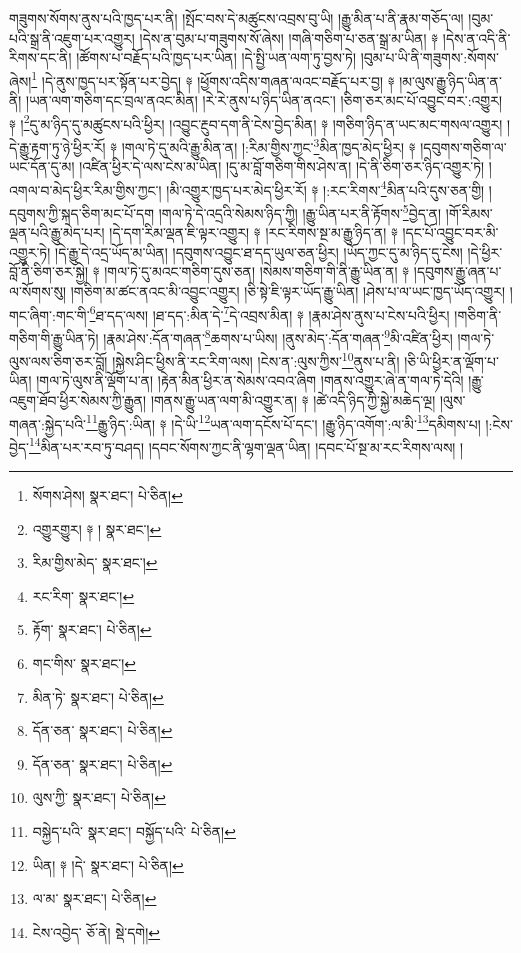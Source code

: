 གཟུགས་སོགས་ནུས་པའི་ཁྱད་པར་ནི། །སྤོང་བས་དེ་མཚུངས་འབྲས་བུ་ཡི། །རྒྱུ་མིན་པ་ནི་རྣམ་གཅོད་ལ། །བུམ་པའི་སྒྲ་ནི་འཇུག་པར་འགྱུར། །དེས་ན་བུམ་པ་གཟུགས་སོ་ཞེས། །གཞི་གཅིག་པ་ཅན་སྒྲ་མ་ཡིན། ༈ །དེས་ན་འདི་ནི་རིགས་དང་ནི། །ཚོགས་པ་བརྗོད་པའི་ཁྱད་པར་ཡིན། །དེ་སྤྱི་ཡན་ལག་ཏུ་བྱས་ཏེ། །བུམ་པ་ཡི་ནི་གཟུགས་:སོགས་ཞེས།\footnote{སོགས་ཤེས།  སྣར་ཐང་།  པེ་ཅིན། } །དེ་ནུས་ཁྱད་པར་སྟོན་པར་བྱེད། ༈ །ཕྱོགས་འདིས་གཞན་ལའང་བརྗོད་པར་བྱ། ༈ །མ་ལུས་རྒྱུ་ཉིད་ཡིན་ན་ནི། །ཡན་ལག་གཅིག་དང་བྲལ་ནའང་མིན། །རེ་རེ་ནུས་པ་ཉིད་ཡིན་ནའང་། །ཅིག་ཅར་མང་པོ་འབྱུང་བར་:འགྱུར། ༈ །\footnote{འགྱུརགྱུར། ༈ །  སྣར་ཐང་། }དུ་མ་ཉིད་དུ་མཚུངས་པའི་ཕྱིར། །འབྱུང་རྔུབ་དག་ནི་ངེས་བྱེད་མིན། ༈ །གཅིག་ཉིད་ན་ཡང་མང་གསལ་འགྱུར། །དེ་རྒྱུ་རྟག་ཏུ་ཉེ་ཕྱིར་རོ། ༈ །གལ་ཏེ་དུ་མའི་རྒྱུ་མིན་ན། །:རིམ་གྱིས་ཀྱང་\footnote{རིམ་གྱིས་མེད་  སྣར་ཐང་། }མིན་ཁྱད་མེད་ཕྱིར། ༈ །དབུགས་གཅིག་ལ་ཡང་དོན་དུ་མ། །འཛིན་ཕྱིར་དེ་ལས་ངེས་མ་ཡིན། །དུ་མ་བློ་གཅིག་གིས་ཤེས་ན། །དེ་ནི་ཅིག་ཅར་ཉིད་འགྱུར་ཏེ། །འགལ་བ་མེད་ཕྱིར་རིམ་གྱིས་ཀྱང་། །མི་འགྱུར་ཁྱད་པར་མེད་ཕྱིར་རོ། ༈ །:རང་རིགས་\footnote{རང་རིག་  སྣར་ཐང་། }མིན་པའི་དུས་ཅན་གྱི། །དབུགས་ཀྱི་སྐད་ཅིག་མང་པོ་དག །གལ་ཏེ་དེ་འདྲའི་སེམས་ཉིད་ཀྱི། །རྒྱུ་ཡིན་པར་ནི་རྟོགས་\footnote{རྟོག་  སྣར་ཐང་།  པེ་ཅིན། }བྱེད་ན། །གོ་རིམས་ལྡན་པའི་རྒྱུ་མེད་པར། །དེ་དག་རིམ་ལྡན་ཇི་ལྟར་འགྱུར། ༈ །རང་རིགས་སྔ་མ་རྒྱུ་ཉིད་ན། ༈ །དང་པོ་འབྱུང་བར་མི་འགྱུར་ཏེ། །དེ་རྒྱུ་དེ་འདྲ་ཡོད་མ་ཡིན། །དབུགས་འབྱུང་ཐ་དད་ཡུལ་ཅན་ཕྱིར། །ཡོད་ཀྱང་དུ་མ་ཉིད་དུ་ངེས། །དེ་ཕྱིར་བློ་ནི་ཅིག་ཅར་སྐྱེ། ༈ །གལ་ཏེ་དུ་མའང་གཅིག་དུས་ཅན། །སེམས་གཅིག་གི་ནི་རྒྱུ་ཡིན་ན། ༈ །དབུགས་རྒྱུ་ཞན་པ་ལ་སོགས་སུ། །གཅིག་མ་ཚང་ནའང་མི་འབྱུང་འགྱུར། །ཅི་སྟེ་ཇི་ལྟར་ཡོད་རྒྱུ་ཡིན། །ཤེས་པ་ལ་ཡང་ཁྱད་ཡོད་འགྱུར། །གང་ཞིག་:གང་གི་\footnote{གང་གིས་  སྣར་ཐང་། }ཐ་དད་ལས། །ཐ་དད་:མིན་དེ་\footnote{མིན་ཏེ་  སྣར་ཐང་།  པེ་ཅིན། }དེ་འབྲས་མིན། ༈ །རྣམ་ཤེས་ནུས་པ་ངེས་པའི་ཕྱིར། །གཅིག་ནི་གཅིག་གི་རྒྱུ་ཡིན་ཏེ། །རྣམ་ཤེས་:དོན་གཞན་\footnote{དོན་ཅན་  སྣར་ཐང་།  པེ་ཅིན། }ཆགས་པ་ཡིས། །ནུས་མེད་:དོན་གཞན་\footnote{དོན་ཅན་  སྣར་ཐང་།  པེ་ཅིན། }མི་འཛིན་ཕྱིར། །གལ་ཏེ་ལུས་ལས་ཅིག་ཅར་བློ། །སྐྱེས་ཤིང་ཕྱིས་ནི་རང་རིག་ལས། །ངེས་ན་:ལུས་ཀྱིས་\footnote{ལུས་ཀྱི་  སྣར་ཐང་།  པེ་ཅིན། }ནུས་པ་ནི། །ཅི་ཡི་ཕྱིར་ན་ལྡོག་པ་ཡིན། །གལ་ཏེ་ལུས་ནི་ལྡོག་པ་ན། །རྟེན་མིན་ཕྱིར་ན་སེམས་འབའ་ཞིག །གནས་འགྱུར་ཞེ་ན་གལ་ཏེ་དེའི། །རྒྱུ་འཇུག་ཐོབ་ཕྱིར་སེམས་ཀྱི་རྒྱུན། །གནས་རྒྱུ་ཡན་ལག་མི་འགྱུར་ན། ༈ །ཚེ་འདི་ཉིད་ཀྱི་སྐྱེ་མཆེད་ལྔ། །ལུས་གཞན་:སྐྱེད་པའི་\footnote{བསྐྱེད་པའི་  སྣར་ཐང་། བསྐྱོད་པའི་  པེ་ཅིན། }རྒྱུ་ཉིད་:ཡིན། ༈ །དེ་ཡི་\footnote{ཡིན། ༈ །དེ་  སྣར་ཐང་།  པེ་ཅིན། }ཡན་ལག་དངོས་པོ་དང་། །རྒྱུ་ཉིད་འགོག་:ལ་མི་\footnote{ལ་མ་  སྣར་ཐང་།  པེ་ཅིན། }དམིགས་པ། །:ངེས་བྱེད་\footnote{ངེས་འབྱེད་  ཅོ་ནེ།  སྡེ་དགེ། }མིན་པར་རབ་ཏུ་བཤད། །དབང་སོགས་ཀྱང་ནི་ལྷག་ལྡན་ཡིན། །དབང་པོ་སྔ་མ་རང་རིགས་ལས། །
